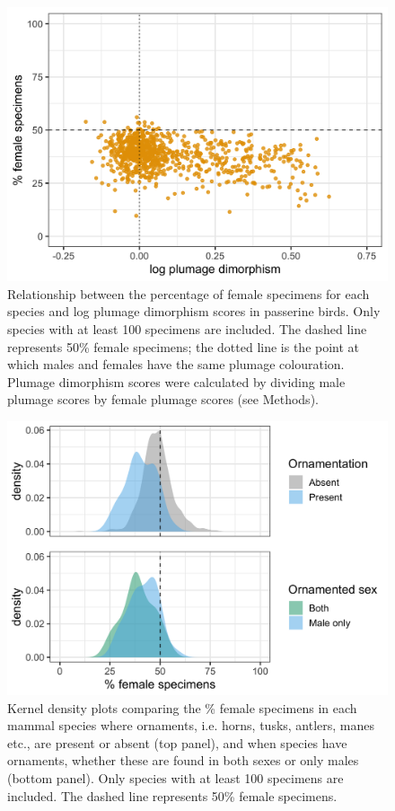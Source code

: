 \documentclass[a4paper, 12pt]{article}
\begin{document}
\newpage
\begin{figure}[h]
 \centering
  \includegraphics[width = \linewidth]{figures/plumage.png}
  \caption{Relationship between the percentage of female specimens for each species and log plumage dimorphism scores in passerine birds. 
  Only species with at least 100 specimens are included. 
  The dashed line represents 50\% female specimens; the dotted line is the point at which males and females have the same plumage colouration. 
  Plumage dimorphism scores were calculated by dividing male plumage scores by female plumage scores (see Methods). 
}
  \label{fig-plumage}
\end{figure}

\newpage
\begin{figure}[h]
 \centering
  \includegraphics[width = \linewidth]{figures/ornamentation.png}
  \caption{Kernel density plots comparing the \% female specimens in each mammal species where ornaments, i.e. horns, tusks, antlers, manes etc., are present or absent (top panel), and when species have ornaments, whether these are found in both sexes or only males (bottom panel). 
  Only species with at least 100 specimens are included. 
  The dashed line represents 50\% female specimens. 
}
  \label{fig-orn}
\end{figure}
\end{document}
